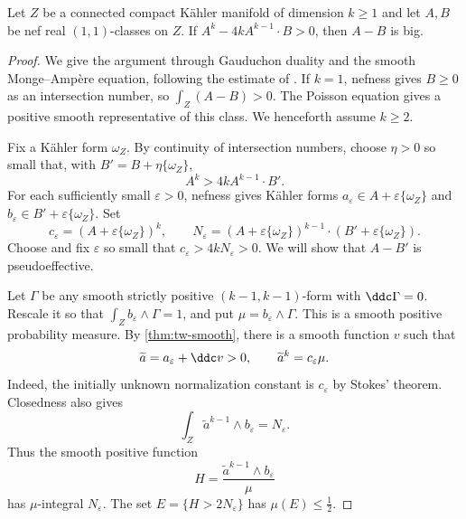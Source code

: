 \begin{theorem}\label{nk:thm:nef-difference}
Let $Z$ be a connected compact K\"ahler manifold of dimension $k\geq1$ and let
$A,B$ be nef real $(1,1)$-classes on $Z$. If
$A^k-4kA^{k-1}\cdot B>0$, then $A-B$ is big.
\end{theorem}
\begin{proof}
We give the argument through Gauduchon duality and the smooth
Monge--Amp\`ere equation, following the estimate of \cite{Xiao15}.
If $k=1$, nefness gives $B\geq0$ as an intersection number, so
$\int_Z(A-B)>0$. The Poisson equation gives a positive smooth
representative of this class. We henceforth assume $k\geq2$.

Fix a K\"ahler form $\omega_Z$. By continuity of intersection numbers,
choose $\eta>0$ so small that, with $B'=B+\eta\{\omega_Z\}$,
\[
 A^k>4kA^{k-1}\cdot B'.
\]
For each sufficiently small $\varepsilon>0$, nefness gives K\"ahler
forms $a_\varepsilon\in A+\varepsilon\{\omega_Z\}$ and
$b_\varepsilon\in B'+\varepsilon\{\omega_Z\}$. Set
\[
 c_\varepsilon=(A+\varepsilon\{\omega_Z\})^k,
 \qquad
 N_\varepsilon=(A+\varepsilon\{\omega_Z\})^{k-1}
                    \cdot(B'+\varepsilon\{\omega_Z\}).
\]
Choose and fix $\varepsilon$ so small that
$c_\varepsilon>4kN_\varepsilon>0$.
We will show that $A-B'$ is pseudoeffective.

Let $\Gamma$ be any smooth strictly positive $(k-1,k-1)$-form with
$\ddc\Gamma=0$. Rescale it so that
$\int_Z b_\varepsilon\wedge\Gamma=1$, and put
$\mu=b_\varepsilon\wedge\Gamma$. This is a smooth positive probability
measure. By \cref{thm:tw-smooth}, there is a smooth function $v$ such that
\[
 \widetilde a=a_\varepsilon+\ddc v>0,
 \qquad \widetilde a^k=c_\varepsilon\mu.
\]
Indeed, the initially unknown normalization constant is
$c_\varepsilon$ by Stokes' theorem. Closedness also gives
\[
 \int_Z\widetilde a^{k-1}\wedge b_\varepsilon=N_\varepsilon.
\]
Thus the smooth positive function
\[
 H=\frac{\widetilde a^{k-1}\wedge b_\varepsilon}{\mu}
\]
has $\mu$-integral $N_\varepsilon$. The set
$E=\{H>2N_\varepsilon\}$ has $\mu(E)\leq\tfrac12$.


\end{proof}
